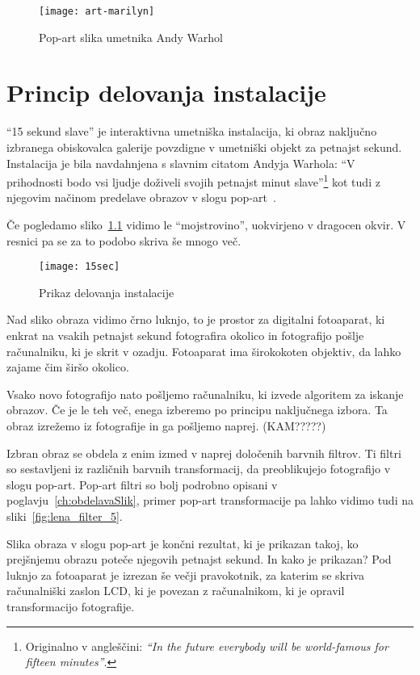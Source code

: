 \begin{figure}[!ht]
    \centering
    \texttt{[image: art-marilyn]}
    \caption{Pop-art slika umetnika Andy Warhol}
    \label{fig:art-marilyn}
\end{figure}


\chapter{Princip delovanja instalacije}
``15 sekund slave'' je interaktivna umetniška instalacija, ki obraz naključno
izbranega obiskovalca galerije povzdigne v umetniški objekt za petnajst
sekund. Instalacija je bila navdahnjena s slavnim citatom Andyja Warhola: ``V
prihodnosti bodo vsi ljudje doživeli svojih petnajst minut
slave''\footnote{Originalno v angleščini: \textit{``In the future everybody
will be world-famous for fifteen minutes''}\cite{andyExhibition}.} kot tudi z njegovim načinom
predelave obrazov v slogu pop-art~\cite{solina200215}.

Če pogledamo sliko~\ref{fig:15sec} vidimo le ``mojstrovino'', uokvirjeno v
dragocen okvir. V resnici pa se za to podobo skriva še mnogo več.

\begin{figure}
    \centering
    \texttt{[image: 15sec]}
    \caption{Prikaz delovanja instalacije}
    \label{fig:15sec}
\end{figure}

Nad sliko obraza vidimo črno luknjo, to je prostor za digitalni fotoaparat, ki enkrat
na vsakih petnajst sekund fotografira okolico in fotografijo pošlje računalniku, ki je skrit v ozadju. Fotoaparat ima širokokoten objektiv, da lahko zajame čim širšo okolico.

Vsako novo fotografijo nato pošljemo računalniku, ki izvede algoritem za iskanje obrazov. Če je le teh več, enega izberemo po principu naključnega izbora. Ta obraz izrežemo iz fotografije in ga pošljemo naprej. (KAM?????)

Izbran obraz se obdela z enim izmed v naprej določenih barvnih filtrov. Ti filtri so sestavljeni iz različnih barvnih transformacij, da preoblikujejo fotografijo v
slogu pop-art. Pop-art filtri so bolj podrobno opisani v
poglavju~\ref{ch:obdelavaSlik}, primer pop-art transformacije pa lahko
vidimo tudi na sliki~\ref{fig:lena_filter_5}.

Slika obraza v slogu pop-art je končni rezultat, ki je prikazan takoj, ko prejšnjemu obrazu poteče njegovih petnajst sekund. In kako je prikazan? Pod luknjo za fotoaparat je izrezan še večji pravokotnik, za katerim se skriva računalniški zaslon LCD, ki je povezan z računalnikom, ki je opravil transformacijo fotografije.

